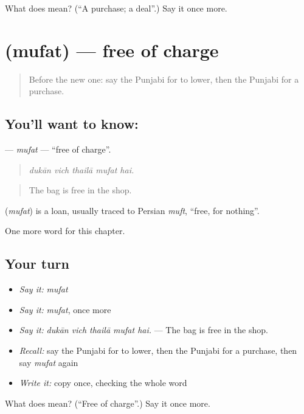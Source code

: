 \begin{tcolorbox}[breakable,colback=teal!4,colframe=teal!35!black,title={Before you move on}]
What does  mean? (\textquotedblleft{}A purchase; a deal\textquotedblright{}.) Say it once more.
\end{tcolorbox}
\section[\texorpdfstring{\pa{ਮੁਫ਼ਤ} (mufat)}{ਮੁਫ਼ਤ (mufat)}]{ (mufat) — free of charge}

\label{lesson:PA-C276-mufat}



\begin{quote}
Before the new one: say the Punjabi for to lower, then the Punjabi for a purchase.
\end{quote}

\subsection*{You'll want to know: }
\textbf{} — \emph{mufat} — \textquotedblleft{}free of charge\textquotedblright{}.

\begin{quote}
    
\end{quote}

\begin{quote}
\emph{dukān vich thailā mufat hai.}
\end{quote}

\begin{quote}
The bag is free in the shop.
\end{quote}

\begin{cousinweb}
\textbf{} (\emph{mufat}) is a loan, usually traced to Persian \emph{muft}, \textquotedblleft{}free, for nothing\textquotedblright{}.
\end{cousinweb}

\begin{grammarlens}[title={What you've built}]
One more word for this chapter.
\end{grammarlens}

\subsection*{Your turn}
\begin{itemize}
\raggedright
  \item \emph{Say it:} \emph{mufat}
  \item \emph{Say it:} \emph{mufat}, once more
  \item \emph{Say it:} \emph{dukān vich thailā mufat hai.} — The bag is free in the shop.
  \item \emph{Recall:} say the Punjabi for to lower, then the Punjabi for a purchase, then say \emph{mufat} again
  \item \emph{Write it:} copy \textbf{} once, checking the whole word
\end{itemize}

\begin{tcolorbox}[breakable,colback=teal!4,colframe=teal!35!black,title={Before you move on}]
What does  mean? (\textquotedblleft{}Free of charge\textquotedblright{}.) Say it once more.
\end{tcolorbox}
